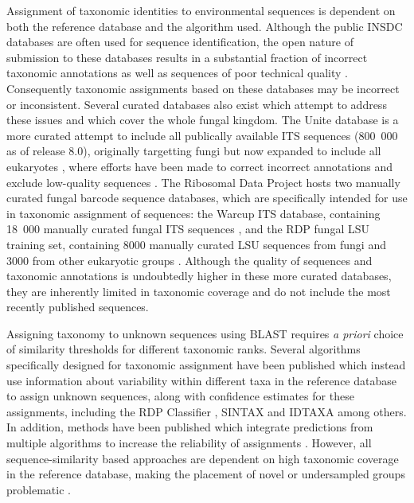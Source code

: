 \documentclass[
  12pt,
]{article}
\begin{document}
Assignment of taxonomic identities to environmental sequences is dependent on both the reference database and the algorithm used.
Although the public INSDC databases \autocite{karsch-mizrachi2018} are often used for sequence identification, the open nature of submission to these databases results in a substantial fraction of incorrect taxonomic annotations \autocite{nilsson2006,steinegger2020} as well as sequences of poor technical quality \autocite{nilsson2012}.
Consequently taxonomic assignments based on these databases may be incorrect or inconsistent.
Several curated databases also exist which attempt to address these issues and which cover the whole fungal kingdom.
The Unite database is a more curated attempt to include all publically available ITS sequences (800~000 as of release 8.0), originally targetting fungi but now expanded to include all eukaryotes \autocite{nilsson2019a}, where efforts have been made to correct incorrect annotations and exclude low-quality sequences \autocite{abarenkov2018a}.
The Ribosomal Data Project \autocite[RDP,][]{cole2014} hosts two manually curated fungal barcode sequence databases, which are specifically intended for use in taxonomic assignment of sequences:
the Warcup ITS database, containing 18~000 manually curated fungal ITS sequences \autocite{deshpande2016}, and the RDP fungal LSU training set, containing 8000 manually curated LSU sequences from fungi and 3000 from other eukaryotic groups \autocite{liu2012}.
Although the quality of sequences and taxonomic annotations is undoubtedly higher in these more curated databases, they are inherently limited in taxonomic coverage and do not include the most recently published sequences.

Assigning taxonomy to unknown sequences using BLAST requires \emph{a priori} choice of similarity thresholds for different taxonomic ranks.
Several algorithms specifically designed for taxonomic assignment have been published which instead use information about variability within different taxa in the reference database to assign unknown sequences, along with confidence estimates for these assignments, including the RDP Classifier \autocite[RDPC,][]{wang2007}, SINTAX \autocite{edgar2016a} and IDTAXA \autocite{murali2018a} among others.
In addition, methods have been published which integrate predictions from multiple algorithms to increase the reliability of assignments \autocite{somervuo2016,gdanetz2017,palmer2018}.
However, all sequence-similarity based approaches are dependent on high taxonomic coverage in the reference database, making the placement of novel or undersampled groups problematic \autocite{nilsson2016top,Tedersoo2018}.
\end{document}
